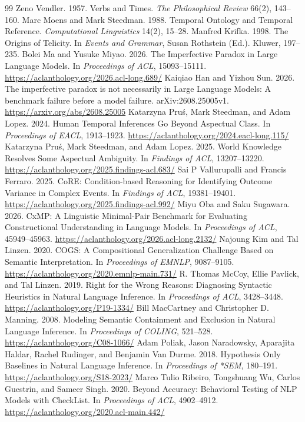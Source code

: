 \documentclass[sigconf,anonymous,review]{acmart}
\begin{document}
\begin{thebibliography}{99}
 Zeno Vendler. 1957. Verbs and Times. \emph{The Philosophical Review} 66(2), 143--160.
 Marc Moens and Mark Steedman. 1988. Temporal Ontology and Temporal Reference. \emph{Computational Linguistics} 14(2), 15--28.
 Manfred Krifka. 1998. The Origins of Telicity. In \emph{Events and Grammar}, Susan Rothstein (Ed.). Kluwer, 197--235.
 Bolei Ma and Yusuke Miyao. 2026. The Imperfective Paradox in Large Language Models. In \emph{Proceedings of ACL}, 15093--15111. \url{https://aclanthology.org/2026.acl-long.689/}
 Kaiqiao Han and Yizhou Sun. 2026. The imperfective paradox is not necessarily in Large Language Models: A benchmark failure before a model failure. arXiv:2608.25005v1. \url{https://arxiv.org/abs/2608.25005}
 Katarzyna Pru\'{s}, Mark Steedman, and Adam Lopez. 2024. Human Temporal Inferences Go Beyond Aspectual Class. In \emph{Proceedings of EACL}, 1913--1923. \url{https://aclanthology.org/2024.eacl-long.115/}
 Katarzyna Pru\'{s}, Mark Steedman, and Adam Lopez. 2025. World Knowledge Resolves Some Aspectual Ambiguity. In \emph{Findings of ACL}, 13207--13220. \url{https://aclanthology.org/2025.findings-acl.683/}
 Sai P Vallurupalli and Francis Ferraro. 2025. CoRE: Condition-based Reasoning for Identifying Outcome Variance in Complex Events. In \emph{Findings of ACL}, 19381--19401. \url{https://aclanthology.org/2025.findings-acl.992/}
 Miyu Oba and Saku Sugawara. 2026. CxMP: A Linguistic Minimal-Pair Benchmark for Evaluating Constructional Understanding in Language Models. In \emph{Proceedings of ACL}, 45949--45963. \url{https://aclanthology.org/2026.acl-long.2132/}
 Najoung Kim and Tal Linzen. 2020. COGS: A Compositional Generalization Challenge Based on Semantic Interpretation. In \emph{Proceedings of EMNLP}, 9087--9105. \url{https://aclanthology.org/2020.emnlp-main.731/}
 R. Thomas McCoy, Ellie Pavlick, and Tal Linzen. 2019. Right for the Wrong Reasons: Diagnosing Syntactic Heuristics in Natural Language Inference. In \emph{Proceedings of ACL}, 3428--3448. \url{https://aclanthology.org/P19-1334/}
 Bill MacCartney and Christopher D. Manning. 2008. Modeling Semantic Containment and Exclusion in Natural Language Inference. In \emph{Proceedings of COLING}, 521--528. \url{https://aclanthology.org/C08-1066/}
 Adam Poliak, Jason Naradowsky, Aparajita Haldar, Rachel Rudinger, and Benjamin Van Durme. 2018. Hypothesis Only Baselines in Natural Language Inference. In \emph{Proceedings of *SEM}, 180--191. \url{https://aclanthology.org/S18-2023/}
 Marco Tulio Ribeiro, Tongshuang Wu, Carlos Guestrin, and Sameer Singh. 2020. Beyond Accuracy: Behavioral Testing of NLP Models with CheckList. In \emph{Proceedings of ACL}, 4902--4912. \url{https://aclanthology.org/2020.acl-main.442/}
\end{thebibliography}
\end{document}

